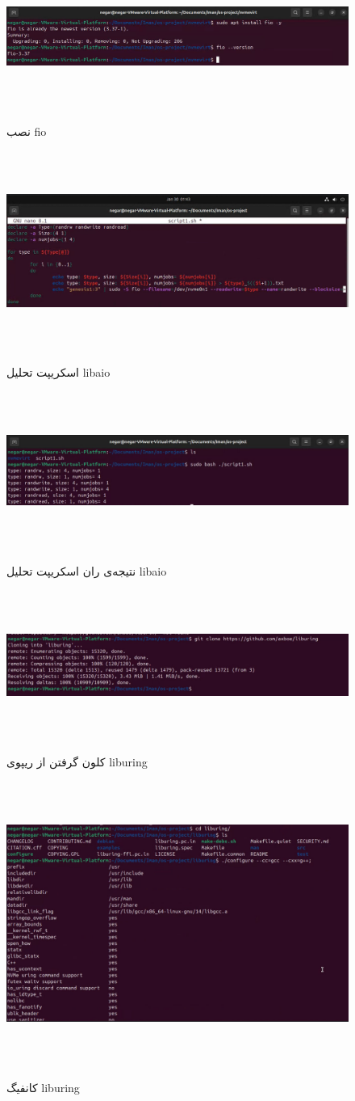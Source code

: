‫
‫‫‫\begin{figure}[H]
‫	‫	‫	‫    \centering
‫	‫	‫	‫    \includegraphics[width=\textwidth]{figs/17.jpg}
‫			\caption{نصب fio}
‫\end{figure}
‫
‫‫‫\begin{figure}[H]
‫	‫	‫	‫    \centering
‫	‫	‫	‫    \includegraphics[width=\textwidth]{figs/18.jpg}
‫			\caption{اسکریپت تحلیل libaio}
‫\end{figure}
‫
‫‫‫\begin{figure}[H]
‫	‫	‫	‫    \centering
‫	‫	‫	‫    \includegraphics[width=\textwidth]{figs/19.jpg}
‫			\caption{نتیجه‌ی ران اسکریپت تحلیل libaio}
‫\end{figure}
‫
‫‫‫\begin{figure}[H]
‫	‫	‫	‫    \centering
‫	‫	‫	‫    \includegraphics[width=\textwidth]{figs/20.jpg}
‫			\caption{کلون گرفتن از ریپوی liburing}
‫\end{figure}
‫
‫‫‫\begin{figure}[H]
‫	‫	‫	‫    \centering
‫	‫	‫	‫    \includegraphics[width=\textwidth]{figs/21.jpg}
‫			\caption{کانفیگ liburing}
‫\end{figure}
